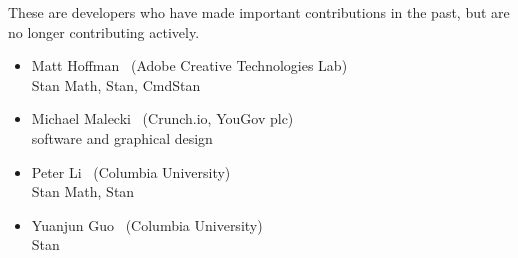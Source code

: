 These are developers who have made important contributions in the
past, but are no longer contributing actively.

\begin{itemize}
\item Matt Hoffman \ (Adobe Creative Technologies Lab)
\\ {\footnotesize Stan Math, Stan, CmdStan}
\item Michael Malecki \ (Crunch.io, YouGov plc)
\\ {\footnotesize software and graphical design}
\item Peter Li \   (Columbia University)
\\ {\footnotesize Stan Math, Stan}
\item Yuanjun Guo \ (Columbia University)
\\ {\footnotesize Stan}
\end{itemize}

